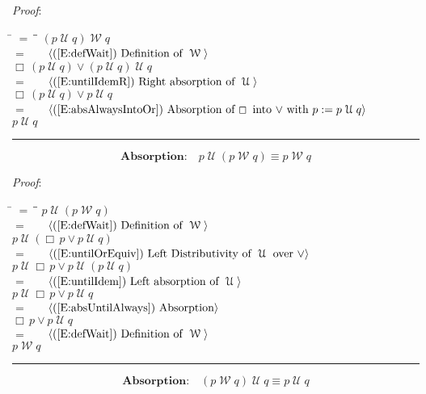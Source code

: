 \documentclass[12pt, fleqn, leqno]{article}
\newcommand{\lgap}{2pt}                             %
\newcommand{\mymathindent}{24pt}                    %
\newcommand{\Until}{\;\mathcal{U}\;}
\newcommand{\Wait}{\;\mathcal{W}\;}
\newcommand{\Always}{\Box\,}
\newcommand{\myqed}{\rule[-.23ex]{1.2ex}{2.0ex}}
\newcommand{\myqedtab}{\hspace{384pt}}              %
\newcommand{\Gll} {\langle}                         %
\newcommand{\Ggg} {\rangle}                         %
\newcommand{\Hint}[1]     {\ \ \ $\Gll              \mbox{#1} \Ggg$ }   %
\begin{document}
\emph{Proof}:
\begin{tabbing}
\hspace{\mymathindent} \= $= \;$ \= \myqedtab \= \kill
\> \> $(p \Until q) \Wait q$\\[\lgap]
\> $=$ \> \Hint{(\ref{E:defWait}) Definition of $\Wait$} \\[\lgap]
\> \> $\Always (p \Until q)\lor (p \Until q) \Until q$\\[\lgap]
\> $=$ \> \Hint{(\ref{E:untilIdemR}) Right absorption of $\Until$} \\[\lgap]
\> \> $\Always (p \Until q)\lor p \Until q$\\[\lgap]
\> $=$ \> \Hint{(\ref{E:absAlwaysIntoOr}) Absorption of $\Always$ into $\lor$ with $p := p\Until q$} \\[\lgap]
\> \> $p \Until q$ \quad \myqed
\end{tabbing}
\begin{equation}\label{E:leftUntilAbsWait}
\textbf{Absorption:}\quad p \Until (p \Wait q) \equiv p \Wait q
\end{equation}

\emph{Proof}:
\begin{tabbing}
\hspace{\mymathindent} \= $= \;$ \= \myqedtab \= \kill
\> \> $p \Until (p \Wait q)$\\[\lgap]
\> $=$ \> \Hint{(\ref{E:defWait}) Definition of $\Wait$} \\[\lgap]
\> \> $p \Until (\Always p\lor p \Until q)$\\[\lgap]
\> $=$ \> \Hint{(\ref{E:untilOrEquiv}) Left Distributivity of $\Until$ over $\lor$} \\[\lgap]
\> \> $p \Until \Always p\lor p \Until (p \Until q)$\\[\lgap]
\> $=$ \> \Hint{(\ref{E:untilIdem}) Left absorption of $\Until$} \\[\lgap]
\> \> $p \Until \Always p\lor p \Until q$\\[\lgap]
\> $=$ \> \Hint{(\ref{E:absUntilAlways}) Absorption} \\[\lgap]
\> \> $\Always p\lor p \Until q$\\[\lgap]
\> $=$ \> \Hint{(\ref{E:defWait}) Definition of $\Wait$} \\[\lgap]
\> \> $p \Wait q$ \quad \myqed
\end{tabbing}
\begin{equation}\label{E:rightUntilAbsWait}
\textbf{Absorption:}\quad (p \Wait q) \Until q \equiv p \Until q
\end{equation}
\end{document}
